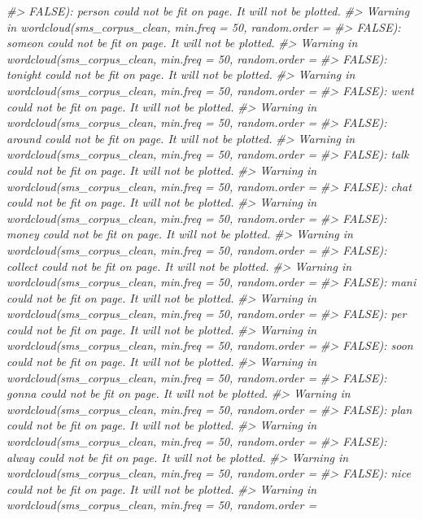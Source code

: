 \documentclass[]{book}
\newenvironment{Shaded}{\begin{snugshade}}{\end{snugshade}}
\newcommand{\CommentTok}[1]{\textcolor[rgb]{0.56,0.35,0.01}{\textit{#1}}}
\begin{document}
\begin{Shaded}
\begin{Highlighting}[]
\CommentTok{#> FALSE): person could not be fit on page. It will not be plotted.}
\CommentTok{#> Warning in wordcloud(sms_corpus_clean, min.freq = 50, random.order =}
\CommentTok{#> FALSE): someon could not be fit on page. It will not be plotted.}
\CommentTok{#> Warning in wordcloud(sms_corpus_clean, min.freq = 50, random.order =}
\CommentTok{#> FALSE): tonight could not be fit on page. It will not be plotted.}
\CommentTok{#> Warning in wordcloud(sms_corpus_clean, min.freq = 50, random.order =}
\CommentTok{#> FALSE): went could not be fit on page. It will not be plotted.}
\CommentTok{#> Warning in wordcloud(sms_corpus_clean, min.freq = 50, random.order =}
\CommentTok{#> FALSE): around could not be fit on page. It will not be plotted.}
\CommentTok{#> Warning in wordcloud(sms_corpus_clean, min.freq = 50, random.order =}
\CommentTok{#> FALSE): talk could not be fit on page. It will not be plotted.}
\CommentTok{#> Warning in wordcloud(sms_corpus_clean, min.freq = 50, random.order =}
\CommentTok{#> FALSE): chat could not be fit on page. It will not be plotted.}
\CommentTok{#> Warning in wordcloud(sms_corpus_clean, min.freq = 50, random.order =}
\CommentTok{#> FALSE): money could not be fit on page. It will not be plotted.}
\CommentTok{#> Warning in wordcloud(sms_corpus_clean, min.freq = 50, random.order =}
\CommentTok{#> FALSE): collect could not be fit on page. It will not be plotted.}
\CommentTok{#> Warning in wordcloud(sms_corpus_clean, min.freq = 50, random.order =}
\CommentTok{#> FALSE): mani could not be fit on page. It will not be plotted.}
\CommentTok{#> Warning in wordcloud(sms_corpus_clean, min.freq = 50, random.order =}
\CommentTok{#> FALSE): per could not be fit on page. It will not be plotted.}
\CommentTok{#> Warning in wordcloud(sms_corpus_clean, min.freq = 50, random.order =}
\CommentTok{#> FALSE): soon could not be fit on page. It will not be plotted.}
\CommentTok{#> Warning in wordcloud(sms_corpus_clean, min.freq = 50, random.order =}
\CommentTok{#> FALSE): gonna could not be fit on page. It will not be plotted.}
\CommentTok{#> Warning in wordcloud(sms_corpus_clean, min.freq = 50, random.order =}
\CommentTok{#> FALSE): plan could not be fit on page. It will not be plotted.}
\CommentTok{#> Warning in wordcloud(sms_corpus_clean, min.freq = 50, random.order =}
\CommentTok{#> FALSE): alway could not be fit on page. It will not be plotted.}
\CommentTok{#> Warning in wordcloud(sms_corpus_clean, min.freq = 50, random.order =}
\CommentTok{#> FALSE): nice could not be fit on page. It will not be plotted.}
\CommentTok{#> Warning in wordcloud(sms_corpus_clean, min.freq = 50, random.order =}

\end{Highlighting}
\end{Shaded}
\end{document}

